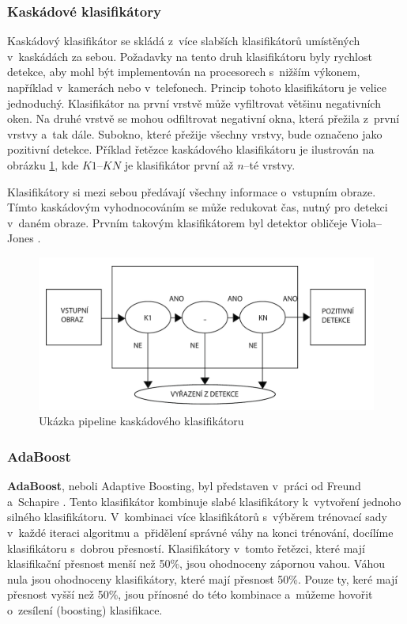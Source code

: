 \subsubsection*{Kaskádové klasifikátory} %
Kaskádový klasifikátor se skládá z~více slabších klasifikátorů umístěných v~kaskádách za sebou. Požadavky na tento druh klasifikátoru byly rychlost detekce, aby mohl být implementován na procesorech s~nižším výkonem, například v~kamerách nebo v~telefonech. Princip tohoto klasifikátoru je velice jednoduchý. Klasifikátor na první vrstvě může vyfiltrovat většinu negativních oken. Na druhé vrstvě se mohou odfiltrovat  negativní okna, která přežila z~první vrstvy a~tak dále. Subokno, které přežije všechny vrstvy, bude označeno jako pozitivní detekce. Příklad řetězce kaskádového klasifikátoru je ilustrován na obrázku \ref{fig:ccpipeline}, kde $K1$--$KN$ je klasifikátor první až $n$--té vrstvy.

Klasifikátory si mezi sebou předávají všechny informace o~vstupním obraze. Tímto kaskádovým vyhodnocováním se může redukovat čas, nutný pro detekci v~daném obraze. Prvním takovým klasifikátorem byl detektor obličeje Viola--Jones \cite{violajones}.  
\begin{figure}[H]
\centering
\includegraphics[width=.8\linewidth]{figures/cascadeClass.pdf}
\caption{Ukázka pipeline kaskádového klasifikátoru}
\label{fig:ccpipeline}
\end{figure}

\subsubsection*{AdaBoost}
\textbf{AdaBoost}, neboli Adaptive Boosting, byl představen v~práci od Freund a~Schapire \cite{adaboost}. Tento klasifikátor kombinuje slabé klasifikátory k~vytvoření jednoho silného klasifikátoru. V~kombinaci více klasifikátorů s~výběrem trénovací sady v~každé iteraci algoritmu a~přidělení správné váhy na konci trénování, docílíme klasifikátoru s~dobrou přesností. Klasifikátory v~tomto řetězci, které mají klasifikační přesnost menší než 50\%, jsou ohodnoceny zápornou vahou. Váhou nula jsou ohodnoceny klasifikátory, které mají přesnost 50\%. Pouze ty, keré mají přesnost vyšší než 50\%, jsou přínosné do této kombinace a~můžeme hovořit o~zesílení (boosting) klasifikace. 

